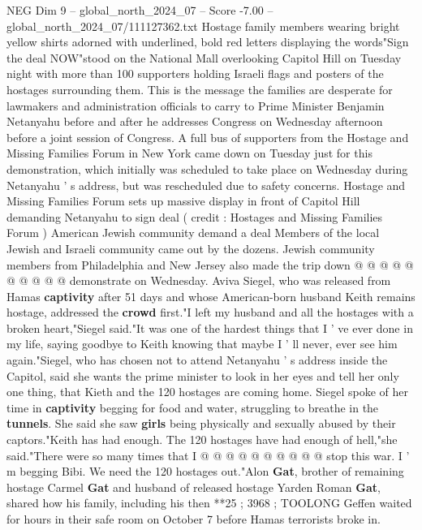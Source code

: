 \begin{textsample}{NEG Dim 9 – global\_north\_2024\_07 – Score -7.00 – global\_north\_2024\_07/111127362.txt}  \label{ex:f9_neg_158}
Hostage family members wearing bright yellow shirts adorned with underlined, bold red letters displaying the words"Sign the deal NOW"stood on the National Mall overlooking Capitol Hill on Tuesday night with more than 100 supporters holding Israeli flags and posters of the hostages surrounding them.
This is the message the families are desperate for lawmakers and administration officials to carry to Prime Minister Benjamin Netanyahu before and after he addresses Congress on Wednesday afternoon before a joint session of Congress.
A full bus of supporters from the Hostage and Missing Families Forum in New York came down on Tuesday just for this demonstration, which initially was scheduled to take place on Wednesday during Netanyahu ' s address, but was rescheduled due to safety concerns.
Hostage and Missing Families Forum sets up massive display in front of Capitol Hill demanding Netanyahu to sign deal ( credit : Hostages and Missing Families Forum ) American Jewish community demand a deal Members of the local Jewish and Israeli community came out by the dozens.
Jewish community members from Philadelphia and New Jersey also made the trip down @ @ @ @ @ @ @ @ @ @ demonstrate on Wednesday.
Aviva Siegel, who was released from Hamas \textbf{captivity} after 51 days and whose American-born husband Keith remains hostage, addressed the \textbf{crowd} first."I left my husband and all the hostages with a broken heart,"Siegel said."It was one of the hardest things that I ' ve ever done in my life, saying goodbye to Keith knowing that maybe I ' ll never, ever see him again."Siegel, who has chosen not to attend Netanyahu ' s address inside the Capitol, said she wants the prime minister to look in her eyes and tell her only one thing, that Kieth and the 120 hostages are coming home.
Siegel spoke of her time in \textbf{captivity} begging for food and water, struggling to breathe in the \textbf{tunnels}.
She said she saw \textbf{girls} being physically and sexually abused by their captors."Keith has had enough.
The 120 hostages have had enough of hell,"she said."There were so many times that I @ @ @ @ @ @ @ @ @ @ stop this war.
I ' m begging Bibi.
We need the 120 hostages out."Alon \textbf{Gat}, brother of remaining hostage Carmel \textbf{Gat} and husband of released hostage Yarden Roman \textbf{Gat}, shared how his family, including his then **25 ; 3968 ; TOOLONG Geffen waited for hours in their safe room on October 7 before Hamas terrorists broke in.

\end{textsample}
